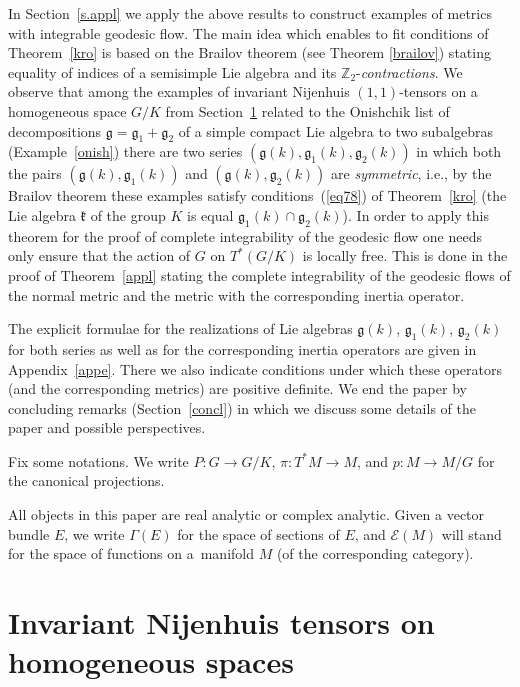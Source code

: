 \documentclass[pdftex]{sigma}
\numberwithin{equation}{section}
\begin{document}
In Section~\ref{s.appl} we apply the above results to construct examples of metrics with integrable geodesic flow. The main idea which enables to fit conditions of Theorem~\ref{kro} is based on the Brailov theorem (see Theorem \ref{brailov}) stating equality of indices of a semisimple Lie algebra and its $\mathbb{Z}_2$-\emph{contractions}. We observe that among the examples of invariant Nijenhuis $(1,1)$-tensors on a homogeneous space $G/K$ from Section~\ref{s.1} related to the Onishchik list of decompositions $\mathfrak{g}=\mathfrak{g}_1+\mathfrak{g}_2$ of a simple compact Lie algebra to two subalgebras (Example~\ref{onish}) there are two series $(\mathfrak{g}(k),\mathfrak{g}_1(k),\mathfrak{g}_2(k))$ in which both the pairs $(\mathfrak{g}(k),\mathfrak{g}_1(k))$ and $(\mathfrak{g}(k),\mathfrak{g}_2(k))$ are \emph{symmetric}, i.e., by the Brailov theorem these examples satisfy conditions~(\ref{eq78}) of Theorem~\ref{kro} (the Lie algebra $\mathfrak{k}$ of the group $K$ is equal $\mathfrak{g}_1(k)\cap\mathfrak{g}_2(k)$). In order to apply this theorem for the proof of complete integrability of the geodesic flow one needs only ensure that the action of $G$ on $T^*(G/K)$ is locally free. This is done in the proof of Theorem~\ref{appl} stating the complete integrability of the geodesic flows of the normal metric and the metric with the corresponding inertia operator.

The explicit formulae for the realizations of Lie algebras $\mathfrak{g}(k)$, $\mathfrak{g}_1(k)$, $\mathfrak{g}_2(k)$ for both series as well as for the corresponding inertia operators are given in Appendix~\ref{appe}. There we also indicate conditions under which these operators (and the corresponding metrics) are positive definite. We end the paper by concluding remarks (Section~\ref{concl}) in which we discuss some details of the paper and possible perspectives.

Fix some notations. We write $P\colon G\to G/K$, $\pi\colon T^*M\to M$, and $p\colon M\to M/G$ for the canonical projections.

All objects in this paper are real analytic or complex analytic. Given a vector bundle $E$, we write $\Gamma(E)$ for the space of sections of $E$, and $\mathcal{E}(M)$ will stand for the space of functions on a~mani\-fold $M$ (of the corresponding category).

\section{Invariant Nijenhuis tensors on homogeneous spaces}\label{s.1}
\end{document}
